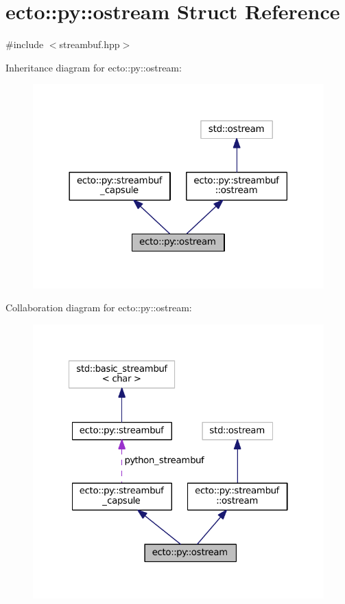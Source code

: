 \hypertarget{structecto_1_1py_1_1ostream}{}\section{ecto\+:\+:py\+:\+:ostream Struct Reference}
\label{structecto_1_1py_1_1ostream}


{\ttfamily \#include $<$streambuf.\+hpp$>$}



Inheritance diagram for ecto\+:\+:py\+:\+:ostream\+:\nopagebreak
\begin{figure}[H]
\begin{center}
\leavevmode
\includegraphics[width=318pt]{structecto_1_1py_1_1ostream__inherit__graph}
\end{center}
\end{figure}


Collaboration diagram for ecto\+:\+:py\+:\+:ostream\+:\nopagebreak
\begin{figure}[H]
\begin{center}
\leavevmode
\includegraphics[width=322pt]{structecto_1_1py_1_1ostream__coll__graph}
\end{center}
\end{figure}
